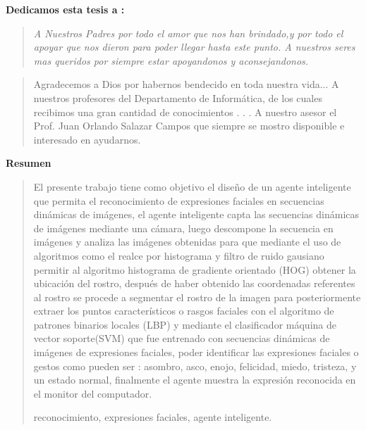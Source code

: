  
 {\bf\Large {Dedicamos esta tesis a :}}
 \vskip 1cm
\begin{quotation}
{\it A Nuestros Padres por todo el amor que nos han brindado,y por todo el apoyar que nos dieron para poder llegar hasta este punto.
\vskip 1cm
A nuestros seres mas queridos por siempre estar apoyandonos y aconsejandonos.
}
\end{quotation}


\newpage

 {\bf\Large {}}
 \vskip 1.5cm
\begin{quotation}
Agradecemos a Dios por habernos bendecido en toda nuestra vida...
{\vskip 1cm}
A nuestros profesores del Departamento de Informática, de los cuales recibimos una gran cantidad de conocimientos  . . .
\vskip 1cm
A nuestro asesor el Prof. Juan Orlando Salazar Campos que siempre se mostro disponible e interesado en ayudarnos.
\vskip 1cm
 \end{quotation}


\newpage
\begin{center}
 {\bf\LARGE Resumen}
\end{center} 
\vskip 0.5cm
\begin{quotation}

El presente trabajo tiene como objetivo el diseño de un agente inteligente que permita el reconocimiento de expresiones faciales en secuencias dinámicas de imágenes, el agente inteligente capta las secuencias dinámicas de imágenes mediante una cámara, luego descompone la secuencia en imágenes y analiza las imágenes obtenidas para que mediante el uso de algoritmos como el realce por histograma y filtro de ruido gausiano permitir al algoritmo histograma de gradiente orientado (HOG) obtener la ubicación del rostro, después de haber obtenido las coordenadas referentes al rostro se procede a segmentar el rostro de la imagen para posteriormente extraer los puntos característicos o rasgos faciales con el algoritmo de patrones binarios locales (LBP) y mediante el clasificador máquina de vector soporte(SVM) que fue entrenado con secuencias dinámicas de imágenes de expresiones faciales, poder identificar las expresiones faciales o gestos como pueden ser : asombro, asco, enojo, felicidad, miedo, tristeza, y un estado normal, finalmente el agente muestra la expresión reconocida en el monitor del computador.
    

\vskip 0.3cm
\hspace*{-0.6cm}{\bf Palabras claves:} reconocimiento, expresiones faciales, agente inteligente.
\end{quotation}


